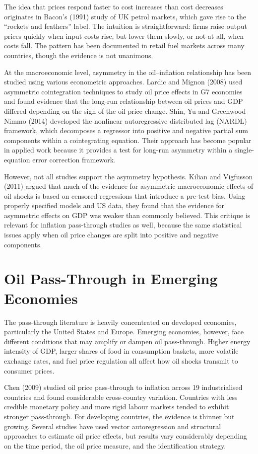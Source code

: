 The idea that prices respond faster to cost increases than cost decreases originates in Bacon's (1991) study of UK petrol markets, which gave rise to the ``rockets and feathers'' label. The intuition is straightforward: firms raise output prices quickly when input costs rise, but lower them slowly, or not at all, when costs fall. The pattern has been documented in retail fuel markets across many countries, though the evidence is not unanimous.

At the macroeconomic level, asymmetry in the oil--inflation relationship has been studied using various econometric approaches. Lardic and Mignon (2008) used asymmetric cointegration techniques to study oil price effects in G7 economies and found evidence that the long-run relationship between oil prices and GDP differed depending on the sign of the oil price change. Shin, Yu and Greenwood-Nimmo (2014) developed the nonlinear autoregressive distributed lag (NARDL) framework, which decomposes a regressor into positive and negative partial sum components within a cointegrating equation. Their approach has become popular in applied work because it provides a test for long-run asymmetry within a single-equation error correction framework.

However, not all studies support the asymmetry hypothesis. Kilian and Vigfusson (2011) argued that much of the evidence for asymmetric macroeconomic effects of oil shocks is based on censored regressions that introduce a pre-test bias. Using properly specified models and US data, they found that the evidence for asymmetric effects on GDP was weaker than commonly believed. This critique is relevant for inflation pass-through studies as well, because the same statistical issues apply when oil price changes are split into positive and negative components.

\section{Oil Pass-Through in Emerging Economies}

The pass-through literature is heavily concentrated on developed economies, particularly the United States and Europe. Emerging economies, however, face different conditions that may amplify or dampen oil pass-through. Higher energy intensity of GDP, larger shares of food in consumption baskets, more volatile exchange rates, and fuel price regulation all affect how oil shocks transmit to consumer prices.

Chen (2009) studied oil price pass-through to inflation across 19 industrialised countries and found considerable cross-country variation. Countries with less credible monetary policy and more rigid labour markets tended to exhibit stronger pass-through. For developing countries, the evidence is thinner but growing. Several studies have used vector autoregression and structural approaches to estimate oil price effects, but results vary considerably depending on the time period, the oil price measure, and the identification strategy.

